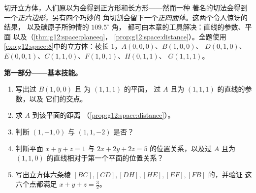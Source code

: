 \begin{problem}
\label{pb:g12:space:1}
切开立方体，人们原以为会得到正方形和长方形——然而一种
著名的切法会得到一个\emph{正六边形}，另有四个巧妙的
角切割会留下一个\emph{正四面体}。这两个令人惊讶的结果，
以及碳原子所钟情的 $109.5^\circ$ 角，
都可由本章的工具解决：直线的参数、平面
以及（\cref{thm:g12:space:planeeq}，
\cref{prop:g12:space:distance}）。全题使用
\cref{exo:g12:space:8}中的立方体：棱长 $1$，$A(0,0,0)$、$B(1,0,0)$、
$D(0,1,0)$、$E(0,0,1)$、$C(1,1,0)$、$F(1,0,1)$、$H(0,1,1)$、
$G(1,1,1)$。

\medskip
\noindent\textbf{第一部分——基本技能。}
\begin{enumerate}
  \item 写出过 $B(1,0,0)$ 且
        为 $(1,1,1)$ 的平面，
        过 $A$ 且为 $(1,1,1)$ 的直线的参数，以及
        它们的交点。
  \item 求 $A$ 到该平面的距离
        （\cref{prop:g12:space:distance}）。
  \item 判断 $(1,-1,0)$ 与 $(1,1,-2)$ 是否？
  \item 判断平面 $x + y + z = 1$ 与
        $2x + 2y + 2z = 5$ 的位置关系，以及过 $A$ 且为
        $(1,1,0)$ 的直线相对于第一个平面的位置关系？
  \item 写出立方体六条棱
        $[BC], [CD], [DH], [HE], [EF], [FB]$ 的，并验证
        这六个点都满足
        $x + y + z = \frac32$。
\end{enumerate}


\end{problem}
